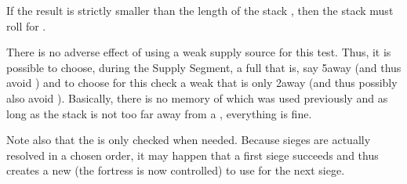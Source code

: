 If the result is strictly smaller than the length of the stack \LoS, then the
stack must roll for .

There is no adverse effect of using a weak supply source for this test. Thus,
it is possible to choose, during the Supply Segment, a full \SoS that is, say
5\MP away (and thus avoid ) and to choose for this
check a weak \SoS that is only 2\MP away (and thus possibly also avoid
). Basically, there is no memory of which \SoS was used
previously and as long as the stack is not too far away from a \SoS,
everything is fine.

Note also that the \SoS is only checked when needed. Because sieges are
actually resolved in a chosen order, it may happen that a first siege succeeds
and thus creates a new \SoS (the fortress is now controlled) to use for the
next siege.


